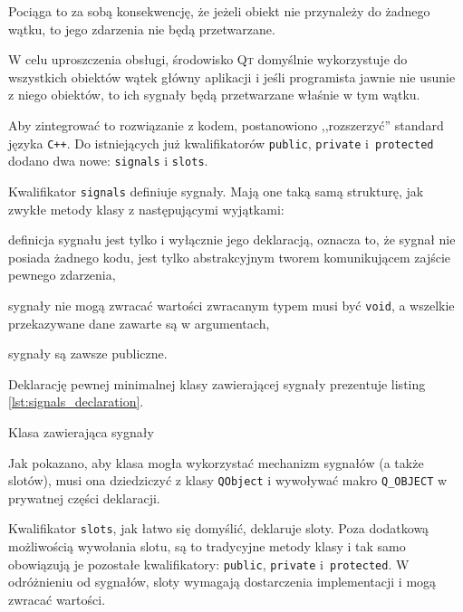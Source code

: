 Pociąga to za sobą konsekwencję, że jeżeli obiekt nie przynależy do żadnego wątku, to jego zdarzenia nie będą przetwarzane.

W celu uproszczenia obsługi, środowisko \textsc{Qt} domyślnie wykorzystuje do wszystkich obiektów wątek główny aplikacji i jeśli programista jawnie nie usunie z niego obiektów, to ich sygnały będą przetwarzane właśnie w tym wątku.

Aby zintegrować to rozwiązanie z kodem, postanowiono ,,rozszerzyć'' standard języka \verb|C++|. Do istniejących już kwalifikatorów \verb|public|, \verb|private| i~\verb|protected| dodano dwa nowe: \verb|signals| i \verb|slots|.

Kwalifikator \verb|signals| definiuje sygnały. Mają one taką samą strukturę, jak zwykłe metody klasy z następującymi wyjątkami:
\begin{aenumerate}
  \item definicja sygnału jest tylko i wyłącznie jego deklaracją, oznacza to, że sygnał nie posiada żadnego kodu, jest tylko abstrakcyjnym tworem komunikującem zajście pewnego zdarzenia,
  \item sygnały nie mogą zwracać wartości \ppauza zwracanym typem musi być \verb|void|, a wszelkie przekazywane dane zawarte są w argumentach,
  \item sygnały są zawsze publiczne.
\end{aenumerate}

Deklarację pewnej minimalnej klasy zawierającej sygnały prezentuje listing \ref{lst:signals_declaration}.

\begin{listing}
  
  \caption{Klasa zawierająca sygnały}
  \label{lst:signals_declaration}
\end{listing}

Jak pokazano, aby klasa mogła wykorzystać mechanizm sygnałów (a także slotów), musi ona dziedziczyć z klasy \verb|QObject| i wywoływać makro \verb|Q_OBJECT| w prywatnej części deklaracji.

Kwalifikator \verb|slots|, jak łatwo się domyślić, deklaruje sloty. Poza dodatkową możliwością wywołania slotu, są to tradycyjne metody klasy i tak samo obowiązują je pozostałe kwalifikatory: \verb|public|, \verb|private| i~\verb|protected|. W odróżnieniu od sygnałów, sloty wymagają dostarczenia implementacji i mogą zwracać wartości.

